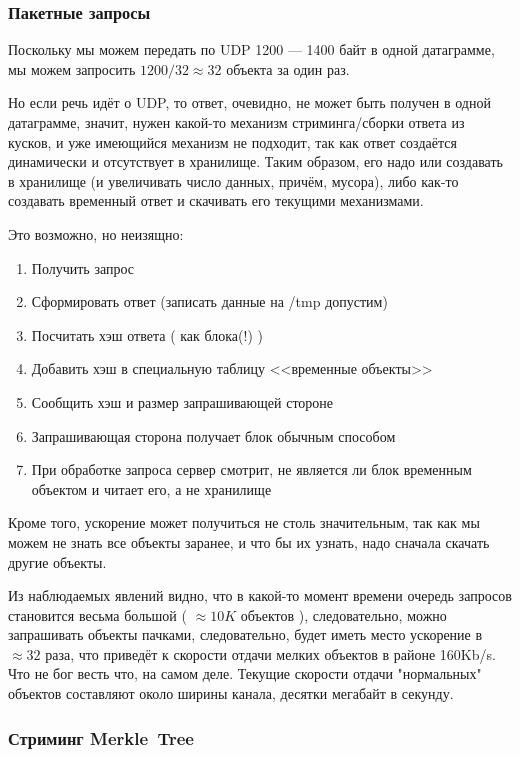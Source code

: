 \documentclass[11pt,a4paper]{article}
\begin{document}
\subsubsection{Пакетные запросы}

Поскольку мы можем передать по UDP 1200 --- 1400 байт в одной датаграмме,
мы можем запросить $ 1200 / 32 \approx 32 $ объекта за один раз.

Но если речь идёт о UDP, то ответ, очевидно, не может быть получен в одной
датаграмме, значит, нужен какой-то механизм стриминга/сборки ответа из кусков,
и уже имеющийся механизм не подходит, так как ответ создаётся динамически и
отсутствует в хранилище. Таким образом, его надо или создавать в хранилище (и
увеличивать число данных, причём, мусора), либо как-то создавать временный
ответ и скачивать его текущими механизмами.

Это возможно, но неизящно:

\begin{enumerate}
  \item Получить запрос
  \item Сформировать ответ (записать данные на /tmp допустим)
  \item Посчитать хэш ответа ( как блока(!) )
  \item Добавить хэш в специальную таблицу <<временные объекты>>
  \item Сообщить хэш и размер запрашивающей стороне
  \item Запрашивающая сторона получает блок обычным способом
  \item При обработке запроса сервер смотрит, не является ли блок временным
    объектом и читает его, а не хранилище
\end{enumerate}

Кроме того, ускорение может получиться не столь значительным, так как
мы можем не знать все объекты заранее, и что бы их узнать, надо сначала
скачать другие объекты.

Из наблюдаемых явлений видно, что в какой-то момент времени очередь запросов
становится весьма большой ( $ \approx 10K $ объектов ), следовательно, можно
запрашивать объекты пачками, следовательно, будет иметь место ускорение в $
\approx 32 $ раза, что приведёт к скорости отдачи мелких объектов в районе
160Kb/s. Что не бог весть что, на самом деле. Текущие скорости отдачи
"нормальных" объектов составляют около ширины канала, десятки мегабайт в
секунду.

\subsubsection{Стриминг Merkle~Tree}
\end{document}
